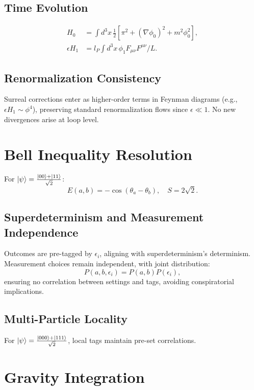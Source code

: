 \documentclass{article}
\begin{document}
\subsection{Time Evolution}
\begin{align}
H_0 &= \int d^3x \, \frac{1}{2} [\pi^2 + (\nabla \phi_0)^2 + m^2 \phi_0^2], \\
\epsilon H_1 &= l_P \int d^3x \, \phi_1 F_{\mu\nu} F^{\mu\nu} / L.
\end{align}

\subsection{Renormalization Consistency}
Surreal corrections enter as higher-order terms in Feynman diagrams (e.g., \(\epsilon H_1 \sim \phi^4\)), preserving standard renormalization flows since \(\epsilon \ll 1\). No new divergences arise at loop level.

\section{Bell Inequality Resolution}
For \(\ket{\psi} = \frac{\ket{00} + \ket{11}}{\sqrt{2}}\):
\begin{equation}
E(a,b) = -\cos(\theta_a - \theta_b), \quad S = 2\sqrt{2}.
\end{equation}

\subsection{Superdeterminism and Measurement Independence}
Outcomes are pre-tagged by \(\epsilon_i\), aligning with superdeterminism’s determinism. Measurement choices remain independent, with joint distribution:
\begin{equation}
P(a, b, \epsilon_i) = P(a, b) P(\epsilon_i),
\end{equation}
ensuring no correlation between settings and tags, avoiding conspiratorial implications.

\subsection{Multi-Particle Locality}
For \(\ket{\psi} = \frac{\ket{000} + \ket{111}}{\sqrt{2}}\), local tags maintain pre-set correlations.

\section{Gravity Integration}
\end{document}
